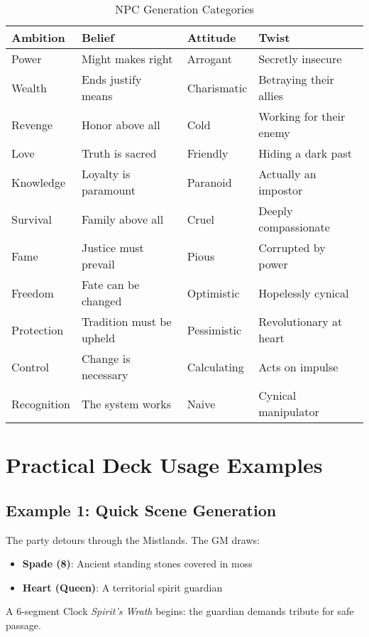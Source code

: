 \begin{table}[htbp]
\centering
\begin{tabular}{p{3.3cm}p{3.3cm}p{3.3cm}p{3.3cm}}
\toprule
\textbf{Ambition} & \textbf{Belief} & \textbf{Attitude} & \textbf{Twist} \\
\midrule
Power & Might makes right & Arrogant & Secretly insecure \\
Wealth & Ends justify means & Charismatic & Betraying their allies \\
Revenge & Honor above all & Cold & Working for their enemy \\
Love & Truth is sacred & Friendly & Hiding a dark past \\
Knowledge & Loyalty is paramount & Paranoid & Actually an impostor \\
Survival & Family above all & Cruel & Deeply compassionate \\
Fame & Justice must prevail & Pious & Corrupted by power \\
Freedom & Fate can be changed & Optimistic & Hopelessly cynical \\
Protection & Tradition must be upheld & Pessimistic & Revolutionary at heart \\
Control & Change is necessary & Calculating & Acts on impulse \\
Recognition & The system works & Naive & Cynical manipulator \\
\bottomrule
\end{tabular}
\caption{NPC Generation Categories}
\label{tab:npc-categories}
\end{table}

\section{Practical Deck Usage Examples}
\label{sec:deck-examples}

\subsection{Example 1: Quick Scene Generation}
\label{subsec:example-quick}

The party detours through the Mistlands. The GM draws:
\begin{itemize}
\item \textbf{Spade (8)}: Ancient standing stones covered in moss
\item \textbf{Heart (Queen)}: A territorial spirit guardian
\end{itemize}
A 6-segment Clock \emph{Spirit's Wrath} begins: the guardian demands tribute for safe passage.

